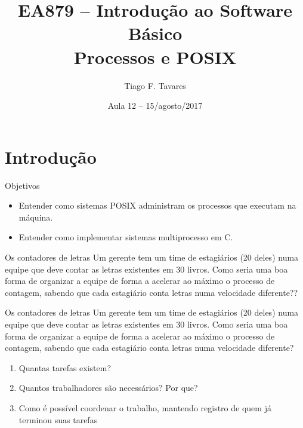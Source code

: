 \documentclass{beamer}
\title[12-posix-e-processos]{EA879 -- Introdução ao Software
Básico\\Processos e POSIX}
\author{Tiago F. Tavares}
\institute{FEEC -- UNICAMP}
\date{Aula 12 -- 15/agosto/2017}
\begin{document}
\begin{frame}
  \titlepage
\end{frame}


\section{Introdução}

\begin{frame}{Objetivos}
  \Large
  \begin{itemize}
    \item Entender como sistemas POSIX administram os processos que executam na
      máquina.
    \item Entender como implementar sistemas multiprocesso em C.
  \end{itemize}
\end{frame}


\begin{frame}[fragile]{Os contadores de letras}
  \centering
  \Large
  Um gerente tem um time de estagiários (20 deles)
  numa equipe que deve contar as letras existentes em 30 livros.
  Como seria uma boa
  forma de organizar a equipe de forma a acelerar ao máximo o processo de
  contagem, sabendo que cada estagiário conta letras numa velocidade diferente??
\end{frame}

\begin{frame}[fragile]{Os contadores de letras}
  \centering
  \large
  Um gerente tem um time de estagiários (20 deles)
  numa equipe que deve contar as letras existentes em 30 livros.
  Como seria uma boa
  forma de organizar a equipe de forma a acelerar ao máximo o processo de
  contagem, sabendo que cada estagiário conta letras numa velocidade diferente?

  \begin{enumerate}
    \item Quantas tarefas existem?
    \item Quantos trabalhadores são necessários? Por que?
    \item Como é possível coordenar o trabalho, mantendo registro de quem já
      terminou suas tarefas
  \end{enumerate}
\end{frame}
\end{document}
